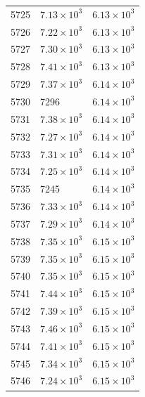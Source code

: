 \begin{table}[H]
\begin{tabular}{lll}
5725 & $\displaystyle 7.13 \times 10^{3}$ & $\displaystyle 6.13 \times 10^{3}$ \\
5726 & $\displaystyle 7.22 \times 10^{3}$ & $\displaystyle 6.13 \times 10^{3}$ \\
5727 & $\displaystyle 7.30 \times 10^{3}$ & $\displaystyle 6.13 \times 10^{3}$ \\
5728 & $\displaystyle 7.41 \times 10^{3}$ & $\displaystyle 6.13 \times 10^{3}$ \\
5729 & $\displaystyle 7.37 \times 10^{3}$ & $\displaystyle 6.14 \times 10^{3}$ \\
5730 & 7296 & $\displaystyle 6.14 \times 10^{3}$ \\
5731 & $\displaystyle 7.38 \times 10^{3}$ & $\displaystyle 6.14 \times 10^{3}$ \\
5732 & $\displaystyle 7.27 \times 10^{3}$ & $\displaystyle 6.14 \times 10^{3}$ \\
5733 & $\displaystyle 7.31 \times 10^{3}$ & $\displaystyle 6.14 \times 10^{3}$ \\
5734 & $\displaystyle 7.25 \times 10^{3}$ & $\displaystyle 6.14 \times 10^{3}$ \\
5735 & 7245 & $\displaystyle 6.14 \times 10^{3}$ \\
5736 & $\displaystyle 7.33 \times 10^{3}$ & $\displaystyle 6.14 \times 10^{3}$ \\
5737 & $\displaystyle 7.29 \times 10^{3}$ & $\displaystyle 6.14 \times 10^{3}$ \\
5738 & $\displaystyle 7.35 \times 10^{3}$ & $\displaystyle 6.15 \times 10^{3}$ \\
5739 & $\displaystyle 7.35 \times 10^{3}$ & $\displaystyle 6.15 \times 10^{3}$ \\
5740 & $\displaystyle 7.35 \times 10^{3}$ & $\displaystyle 6.15 \times 10^{3}$ \\
5741 & $\displaystyle 7.44 \times 10^{3}$ & $\displaystyle 6.15 \times 10^{3}$ \\
5742 & $\displaystyle 7.39 \times 10^{3}$ & $\displaystyle 6.15 \times 10^{3}$ \\
5743 & $\displaystyle 7.46 \times 10^{3}$ & $\displaystyle 6.15 \times 10^{3}$ \\
5744 & $\displaystyle 7.41 \times 10^{3}$ & $\displaystyle 6.15 \times 10^{3}$ \\
5745 & $\displaystyle 7.34 \times 10^{3}$ & $\displaystyle 6.15 \times 10^{3}$ \\
5746 & $\displaystyle 7.24 \times 10^{3}$ & $\displaystyle 6.15 \times 10^{3}$ \\

\end{tabular}
\end{table}
